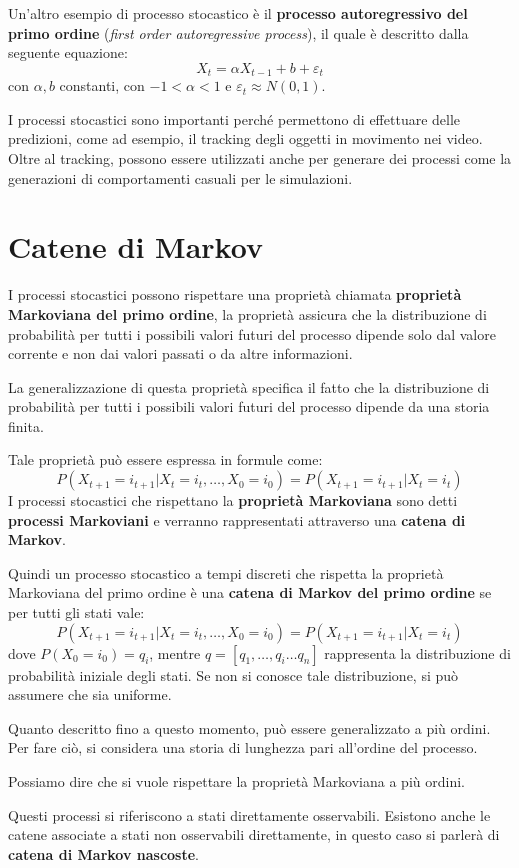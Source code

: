 Un'altro esempio di processo stocastico è il \textbf{processo autoregressivo del
    primo ordine} (\textit{first order autoregressive process}), il quale è descritto
dalla seguente equazione:
\begin{equation*}
    X_t = \alpha X_{t-1} + b + \varepsilon_t
\end{equation*}
con $\alpha,b$ constanti, con $-1<\alpha<1$ e $\varepsilon_t \approx N(0,1)$.

I processi stocastici sono importanti perché permettono di effettuare delle
predizioni, come ad esempio, il tracking degli oggetti in movimento nei video.
Oltre al tracking, possono essere utilizzati anche per generare dei processi come
la generazioni di comportamenti casuali per le simulazioni.
\section{Catene di Markov}
I processi stocastici possono rispettare una proprietà chiamata \textbf{proprietà
    Markoviana del primo ordine}, la proprietà assicura che la distribuzione di
probabilità per tutti i possibili valori futuri del processo dipende solo dal
valore corrente e non dai valori passati o da altre informazioni.

La generalizzazione di questa proprietà specifica il fatto che la distribuzione
di probabilità per tutti i possibili valori futuri del processo dipende da una
storia finita.

Tale proprietà può essere espressa in formule come:
\begin{equation}
    P(X_{t+1} = i_{t+1 } | X_t =i_t, \dots, X_{0} = i_{0})=P(X_{t+1} = i_{t+1 } | X_t =i_t)
\end{equation}
I processi stocastici che rispettano la \textbf{proprietà Markoviana} sono detti
\textbf{processi Markoviani} e verranno rappresentati attraverso una \textbf{catena di Markov}.

Quindi un processo stocastico a tempi discreti che rispetta la proprietà Markoviana
del primo ordine è una \textbf{catena di Markov del primo ordine} se per tutti
gli stati vale:
\begin{equation*}
    P(X_{t+1} = i_{t+1 } | X_t =i_t, \dots, X_{0} = i_{0}) = P(X_{t+1} = i_{t+1 } | X_t =i_t)
\end{equation*}
dove $P(X_0 = i_0) = q_i$, mentre $q = [q_1, \dots, q_i \dots q_n]$ rappresenta la
distribuzione di probabilità iniziale degli stati. Se non si conosce tale
distribuzione, si può assumere che sia uniforme.
\begin{nota}
    Quanto descritto fino a questo momento, può essere generalizzato a più ordini.
    Per fare ciò, si considera una storia di lunghezza pari all'ordine del processo.

    Possiamo dire che si vuole rispettare la proprietà Markoviana a più ordini.
\end{nota}
Questi processi si riferiscono a stati direttamente osservabili. Esistono anche
le catene associate a stati non osservabili direttamente, in questo caso si
parlerà di \textbf{catena di Markov nascoste}.

